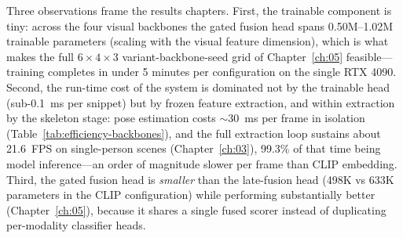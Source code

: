 Three observations frame the results chapters. First, the trainable component
is tiny: across the four visual backbones the gated fusion head spans
0.50M--1.02M trainable parameters (scaling with the visual feature dimension),
which is what makes the full $6 \times 4 \times 3$
variant-backbone-seed grid of Chapter~\ref{ch:05} feasible---training
completes in under 5 minutes per configuration on the single RTX 4090.
Second, the run-time cost of the system is dominated not by the trainable head
(sub-0.1~ms per snippet) but by frozen feature extraction, and within
extraction by the skeleton stage: pose estimation costs ${\sim}30$~ms per
frame in isolation (Table~\ref{tab:efficiency-backbones}), and the full
extraction loop sustains about 21.6~FPS on single-person scenes
(Chapter~\ref{ch:03}), 99.3\% of that time being model inference---an order
of magnitude slower per frame than CLIP embedding. Third, the gated fusion head
is \emph{smaller} than the late-fusion head (498K vs 633K parameters in the
CLIP configuration) while performing substantially better
(Chapter~\ref{ch:05}), because it shares a single fused scorer instead of
duplicating per-modality classifier heads.
